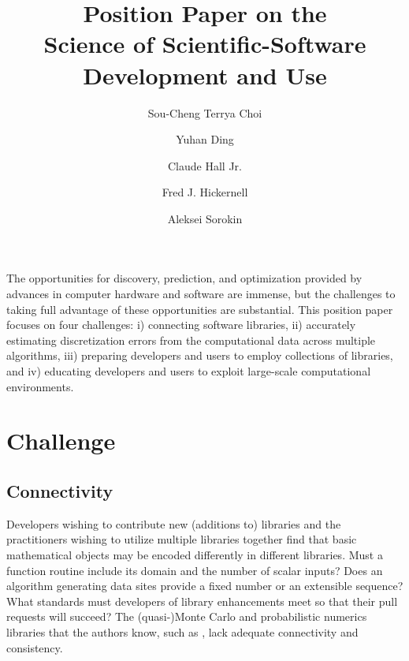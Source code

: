 \documentclass{amsart}
\newcommand{\CDHJNote}[1]{{\color{red}Claude: #1}}
\begin{document}
\title{Position Paper on the \\ Science of Scientific-Software Development and Use}
\author{\vspace{-2ex}Sou-Cheng Terrya Choi}
\address[Choi, Ding, Hickernell, Sorokin]{Department of Applied Mathematics, RE 220, 10 W. 32nd St., Chicago, IL 60616}
\author{Yuhan Ding}
\author{Claude Hall Jr.}
\address[Hall]{Birmingham Southern College, 900 Arkadelpha Rd, Birmingham, AL, 35254}
\author{Fred J. Hickernell}
\author{Aleksei Sorokin}



\maketitle

\vspace{-5ex}

The opportunities for discovery, prediction, and optimization provided by advances in computer hardware and software are immense, but the challenges to taking full advantage of these opportunities are substantial. This position paper focuses on four challenges: i) connecting software libraries, ii) accurately 
estimating discretization errors from the computational data across multiple algorithms, iii) preparing developers and users to employ collections of libraries, and iv) educating developers and users to exploit large-scale computational environments.


\section{Challenge} %
\subsection{Connectivity} 
Developers wishing to contribute new (additions to) libraries and the practitioners wishing to utilize multiple libraries together find that basic mathematical objects may be encoded differently in different libraries.  Must a function routine include its domain and the number of scalar inputs?  Does an algorithm generating data sites provide a fixed number or an extensible sequence?  What standards must developers of library enhancements meet so that their pull requests will succeed? The (quasi-)Monte Carlo and probabilistic numerics libraries that the authors know, such as \cite{QMCPy2020a,SciPyQMC,STAN,probnum}, lack  adequate connectivity and consistency.
\end{document}
